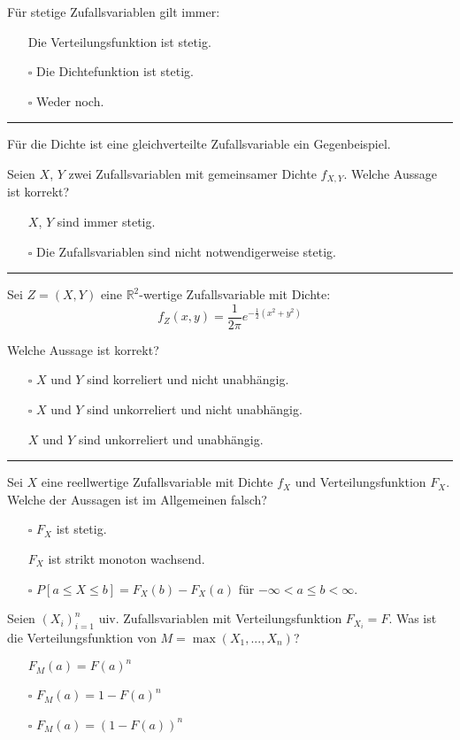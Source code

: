 \begin{tiny}
    Für stetige Zufallsvariablen gilt immer:
    \begin{itemize}
        \item[\checkmark] Die Verteilungsfunktion ist stetig.
        \item[$\square$] Die Dichtefunktion ist stetig.
        \item[$\square$] Weder noch.
    \end{itemize}
    \rule{\linewidth}{0.4pt}

    Für die Dichte ist eine gleichverteilte Zufallsvariable ein Gegenbeispiel.

    Seien $X$, $Y$ zwei Zufallsvariablen mit gemeinsamer Dichte $f_{X,Y}$. Welche Aussage ist korrekt?
    \begin{itemize}
        \item[\checkmark] $X$, $Y$ sind immer stetig.
        \item[$\square$] Die Zufallsvariablen sind nicht notwendigerweise stetig.
    \end{itemize}
    \rule{\linewidth}{0.4pt}

    Sei $Z = (X, Y)$ eine $\mathbb{R}^2$-wertige Zufallsvariable mit Dichte:
    \[ f_Z (x, y) = \frac{1}{2\pi} e^{-\frac{1}{2} (x^2 + y^2)} \]

    Welche Aussage ist korrekt?
    \begin{itemize}
        \item[$\square$] $X$ und $Y$ sind korreliert und nicht unabhängig.
        \item[$\square$] $X$ und $Y$ sind unkorreliert und nicht unabhängig.
        \item[\checkmark] $X$ und $Y$ sind unkorreliert und unabhängig.
    \end{itemize}
    \rule{\linewidth}{0.4pt}

    Sei $X$ eine reellwertige Zufallsvariable mit Dichte $f_X$ und Verteilungsfunktion $F_X$. Welche der Aussagen ist im Allgemeinen falsch?
    \begin{itemize}
        \item[$\square$] $F_X$ ist stetig.
        \item[\checkmark] $F_X$ ist strikt monoton wachsend.
        \item[$\square$] $P[a \leq X \leq b] = F_X(b) - F_X(a)$ für $-\infty < a \leq b < \infty$.
    \end{itemize}

    Seien $(X_i)_{i=1}^n$ uiv. Zufallsvariablen mit Verteilungsfunktion $F_{X_i} = F$. Was ist die Verteilungsfunktion von $M = \max(X_1, ..., X_n)$?
    \begin{itemize}
        \item[\checkmark] $F_M (a) = F(a)^n$
        \item[$\square$] $F_M (a) = 1 - F(a)^n$
        \item[$\square$] $F_M (a) = (1 - F(a))^n$
    \end{itemize}


\end{tiny}
